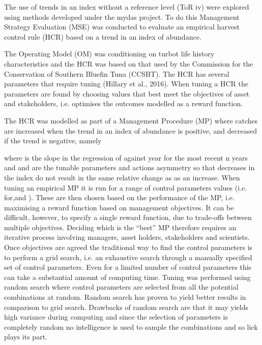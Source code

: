 \documentclass[12pt,doublespacing,a4paper]{ouparticle}
\begin{document}
The use of trends in an index without a reference level (ToR iv) were explored using methods developed under the mydas project.  To do this Management Strategy Evaluation (MSE) was conducted to evaluate an empirical harvest control rule (HCR) based on a trend in an index of abundance. 

The  Operating Model (OM) was conditioning on turbot life history characteristics and the HCR was based on that used by the Commission for the Conservation of Southern Bluefin Tuna (CCSBT). The HCR has several parameters that require tuning (Hillary et al., 2016). When tuning a HCR the parameters are found by choosing values that best meet the objectives of  asset and stakeholders, i.e. optimises the outcomes modelled as a reward function. 

The HCR was modelled as part of a  Management Procedure (MP) where catches are increased when the trend in an index of abundance is positive, and decreased if the trend is negative, namely







where  is the slope in the regression of  against year for the most recent n years and  and  are  the tunable parameters and actions asymmetry so that decreases in the index do not result in the same relative change as as an increase.
When tuning an empirical MP it is run for a range of control parameters values (i.e. for,and ). These are then chosen based on the performance of the MP, i.e.  maximising a reward function based on management objectives. It can be difficult, however, to specify a single reward function, due to trade-offs between multiple objectives. Deciding which is the “best” MP therefore requires an iterative process involving managers, asset holders, stakeholders and scientists.
Once objectives are agreed the traditional way to find the control parameters is to perform  a grid search, i.e. an exhaustive search through a manually specified set of control parameters. Even for a limited number of control parameters this can take a substantial amount of computing time. Tuning was performed using random search where control parameters are selected from all the potential combinations at random.  Random search has proven to yield better results in comparison to grid search. Drawbacks of random search are that it may yields high variance during computing and since the selection of parameters is completely random no intelligence is used to sample the combinations and so lick plays its part. 
\end{document}
